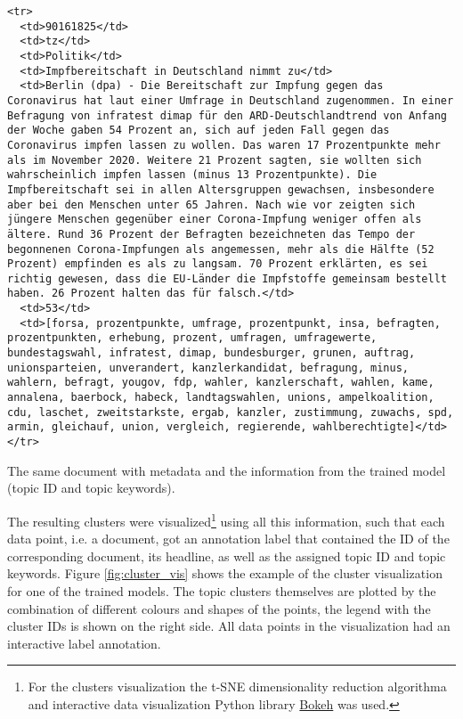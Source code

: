 \documentclass[fontsize=12pt,a4paper,twoside,openany]{scrbook}
\begin{document}
\begin{listing}[ht]
\begin{verbatim}
<tr>
  <td>90161825</td>
  <td>tz</td>
  <td>Politik</td>
  <td>Impfbereitschaft in Deutschland nimmt zu</td>
  <td>Berlin (dpa) - Die Bereitschaft zur Impfung gegen das Coronavirus hat laut einer Umfrage in Deutschland zugenommen. In einer Befragung von infratest dimap für den ARD-Deutschlandtrend von Anfang der Woche gaben 54 Prozent an, sich auf jeden Fall gegen das Coronavirus impfen lassen zu wollen. Das waren 17 Prozentpunkte mehr als im November 2020. Weitere 21 Prozent sagten, sie wollten sich wahrscheinlich impfen lassen (minus 13 Prozentpunkte). Die Impfbereitschaft sei in allen Altersgruppen gewachsen, insbesondere aber bei den Menschen unter 65 Jahren. Nach wie vor zeigten sich jüngere Menschen gegenüber einer Corona-Impfung weniger offen als ältere. Rund 36 Prozent der Befragten bezeichneten das Tempo der begonnenen Corona-Impfungen als angemessen, mehr als die Hälfte (52 Prozent) empfinden es als zu langsam. 70 Prozent erklärten, es sei richtig gewesen, dass die EU-Länder die Impfstoffe gemeinsam bestellt haben. 26 Prozent halten das für falsch.</td>
  <td>53</td>
  <td>[forsa, prozentpunkte, umfrage, prozentpunkt, insa, befragten, prozentpunkten, erhebung, prozent, umfragen, umfragewerte, bundestagswahl, infratest, dimap, bundesburger, grunen, auftrag, unionsparteien, unverandert, kanzlerkandidat, befragung, minus, wahlern, befragt, yougov, fdp, wahler, kanzlerschaft, wahlen, kame, annalena, baerbock, habeck, landtagswahlen, unions, ampelkoalition, cdu, laschet, zweitstarkste, ergab, kanzler, zustimmung, zuwachs, spd, armin, gleichauf, union, vergleich, regierende, wahlberechtigte]</td>
</tr>
\end{verbatim}
\caption{The same document with metadata and the information from the trained model (topic ID and topic keywords).} 
\label{listing:data-example}
\end{listing}

The resulting clusters were visualized\footnote{For the clusters visualization the t-SNE dimensionality reduction algorithma and interactive data visualization Python library \href{https://bokeh.org/}{Bokeh} was used.} using all this information, such that each data point, i.e. a document, got an annotation label that contained the ID of the corresponding document, its headline, as well as the assigned topic ID and topic keywords. Figure \ref{fig:cluster_vis} shows the example of the cluster visualization for one of the trained models. The topic clusters themselves are plotted by the combination of different colours and shapes of the points, the legend with the cluster IDs is shown on the right side. All data points in the visualization had an interactive label annotation. 
\end{document}
